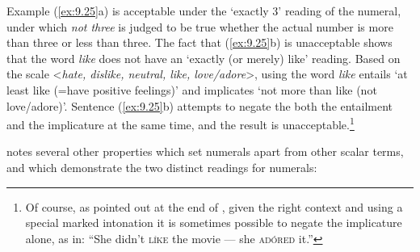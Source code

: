  
Example (\ref{ex:9.25}a) is acceptable under the ‘exactly 3’ reading of the numeral, under which \textit{not three} is judged to be true whether the actual number is more than three or less than three. The fact that (\ref{ex:9.25}b) is unacceptable shows that the word \textit{like} does not have an ‘exactly (or merely) like’ reading. Based on the scale <\textit{hate, dislike, neutral, like, love/adore}>, using the word \textit{like} entails ‘at least like (=have positive feelings)’ and implicates ‘not more than like (not love/adore)’. Sentence (\ref{ex:9.25}b) attempts to negate the both the entailment and the implicature at the same time, and the result is unacceptable.\footnote{Of course, as pointed out at the end of , given the right context and using a special marked intonation it is sometimes possible to negate the implicature alone, as in: “She didn’t \textsc{líke} the movie — she \textsc{adóred} it.”}


\ea \label{ex:9.25}
                       \z
\z


\citet{Horn1992} notes several other properties which set numerals apart from other scalar terms, and which demonstrate the two distinct readings for numerals:



